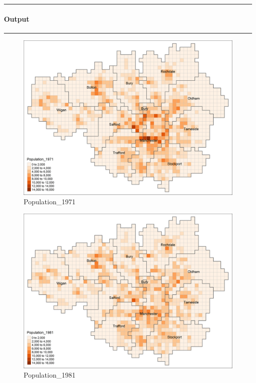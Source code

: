 \documentclass[
]{article}
\begin{document}
\begin{center}\rule{0.5\linewidth}{0.5pt}\end{center}

\hypertarget{output}{%
\paragraph{Output}\label{output}}

\begin{center}\rule{0.5\linewidth}{0.5pt}\end{center}

\begin{figure}
\centering
\includegraphics{Population_1971.png}
\caption{Population\_1971}
\end{figure}

\begin{figure}
\centering
\includegraphics{Population_1981.png}
\caption{Population\_1981}
\end{figure}
\end{document}
